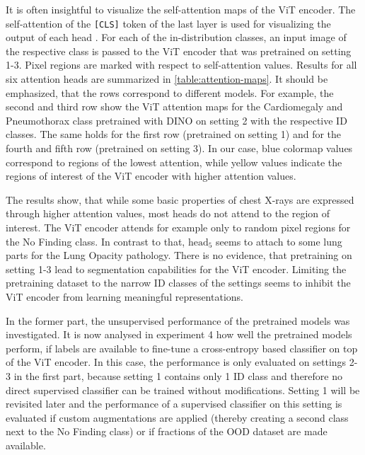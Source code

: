 \par
It is often insightful to visualize the self-attention maps of the ViT encoder.
The self-attention of the \texttt{[CLS]} token of the last layer is used for visualizing the output of each head \citep{Caron2021,Dosovitskiy2020}.
For each of the in-distribution classes, an input image of the respective class is passed to the ViT encoder that was pretrained on setting 1-3.
Pixel regions are marked with respect to self-attention values.
Results for all six attention heads are summarized in \ref{table:attention-maps}.
It should be emphasized, that the rows correspond to different models.
For example, the second and third row show the ViT attention maps for the Cardiomegaly and Pneumothorax class pretrained with DINO on setting 2 with the respective ID classes.
The same holds for the first row (pretrained on setting 1) and for the fourth and fifth row (pretrained on setting 3).
In our case, blue colormap values correspond to regions of the lowest attention, while yellow values indicate the regions of interest of the ViT encoder with higher attention values.
\par
The results show, that while some basic properties of chest X-rays are expressed through higher attention values, most heads do not attend to the region of interest.
The ViT encoder attends for example only to random pixel regions for the No Finding class.
In contrast to that, $\text{head}_5$ seems to attach to some lung parts for the Lung Opacity pathology.
There is no evidence, that pretraining on setting 1-3 lead to segmentation capabilities for the ViT encoder.
Limiting the pretraining dataset to the narrow ID classes of the settings seems to inhibit the ViT encoder from learning meaningful representations.
\par
In the former part, the unsupervised performance of the pretrained models was investigated.
It is now analysed in experiment 4 how well the pretrained models perform, if labels are available to fine-tune a cross-entropy based classifier on top of the ViT encoder.
In this case, the performance is only evaluated on settings 2-3 in the first part, because setting 1 contains only 1 ID class and therefore no direct supervised classifier can be trained without modifications.
Setting 1 will be revisited later and the performance of a supervised classifier on this setting is evaluated if custom augmentations are applied (thereby creating a second class next to the No Finding class) or if fractions of the OOD dataset are made available.
